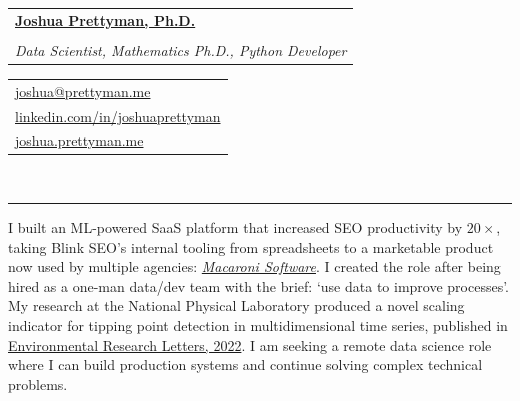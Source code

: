 \documentclass[10pt]{article}
\makeatletter
\newcommand{\makeheading}[8][]{
	\hspace*{-\marginparsep minus \marginparwidth}%
	\begin{minipage}[t]{\textwidth+\marginparwidth+\marginparsep}%
		\begin{tabular}[t]{@{}l}
		{\hspace{-8pt} \Large \bfseries#2}\\
		\\
		{\normalsize \emph{#3}}
		\end{tabular}
		\hfill
		\begin{tabular}[t]{|l}
		#4  \\
		#5  \\
		#6 \\
		
		\end{tabular}
		\vspace{1pt}
		\\[-0.2\baselineskip]%
		
		\rule{\columnwidth}{1pt}%
	\end{minipage}
}
\renewcommand{\section}[1]{
	\pagebreak[3]%
	\hyphenpenalty=10000%
	\vspace{\baselineskip}%
	\phantomsection\addcontentsline{toc}{section}{#1}%
	\noindent{\scshape #1}%
	\vspace{\baselineskip}\par
}
\newenvironment{innerlist}[1][\enskip\textbullet]{
	\begin{itemize}[#1,leftmargin=*,parsep=0pt,itemsep=1pt,topsep=2pt,partopsep=0pt]
}{\end{itemize}}
\providecommand*\url[1]{\href{#1}{#1}}
\renewcommand*\url[1]{\href{#1}{\texttt{#1}}}
\providecommand*\email[1]{\href{mailto:#1}{#1}}
\makeatother
\begin{document}
\makeheading{
		\href{https://joshua.prettyman.me/}{Joshua Prettyman, Ph.D.}
}
{Data Scientist, Mathematics Ph.D., Python Developer}
{\email{joshua@prettyman.me}}
{\href{https://www.linkedin.com/in/joshuaprettyman/}{linkedin.com/in/joshuaprettyman}}
{\href{https://joshua.prettyman.me/}{joshua.prettyman.me}}







\section{Personal Statement}
I built an ML-powered SaaS platform that increased SEO productivity by $20\times$, taking Blink SEO's internal tooling from spreadsheets to a marketable product now used by multiple agencies: \href{https://www.macaroni.works}{\textit{Macaroni Software}}. I created the role after being hired as a one-man data/dev team with the brief: `use data to improve processes'. 
My research at the National Physical Laboratory produced a novel scaling indicator for tipping point detection in multidimensional time series, published in \href{https://doi.org/10.1088/1748-9326/ac526f}{Environmental Research Letters, 2022}.
I am seeking a remote data science role where I can build production systems and continue solving complex technical problems.


\end{document}
